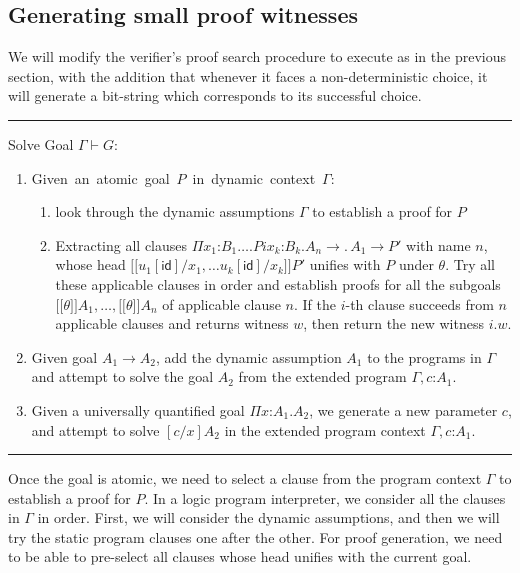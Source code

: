 \documentclass{acmconf}
\newcommand{\figfoot}{\vspace{1ex}\hrule}
\newcommand{\fighead}{\hrule\vspace{1.5ex}}
\newcommand{\ldot}{.\,}
\newcommand{\vd}{\vdash}
\newcommand{\arrow}{\rightarrow}
\newcommand{\oftp}{\mathord{:}}
\newcommand{\lbb}{{[\![}}
\newcommand{\rbb}{{]\!]}}
\newcommand{\id}{\mathsf{id}}
\newcommand{\msub}[1]{\lbb #1 \rbb}
\begin{document}
\subsection{Generating small proof witnesses}

We will modify the verifier's proof search procedure to execute as in
the previous section, with the addition that whenever it faces a
non-deterministic choice, it will generate a bit-string which
corresponds to its successful choice. 

\fighead
\begin{small}
Solve Goal $\Gamma \vd G$:
\begin{enumerate}
\item \mbox{Given an atomic goal $P$ in dynamic context
    $\Gamma$:}\hfill\\
  \begin{enumerate}
  \item look through the dynamic assumptions $\Gamma$ to establish a proof for $P$ 
  \item Extracting all clauses $\Pi x_1\oftp B_1\ldots.Pi x_k\oftp
    B_k. A_n \rightarrow \ldot A_1 \rightarrow P'$ with name $n$,
    whose head $\msub{u_1[\id]/x_1, \ldots u_k[\id]/x_k}P'$ unifies
    with $P$ under $\theta$. Try all these applicable clauses in
    order and establish proofs for all the subgoals
    $\msub{\theta}A_1, \ldots, \msub{\theta}A_n$ of applicable clause
    $n$. If the $i$-th clause succeeds from $n$ applicable clauses and
    returns witness $w$, then return the new witness $i . w$.
  \end{enumerate}

\item Given goal $A_1 \arrow A_2$, add the dynamic assumption $A_1$ to the
  programs in $\Gamma$ and attempt to solve the goal $A_2$ from the extended
  program $\Gamma, c\oftp A_1$.
\item Given a universally quantified goal $\Pi x\oftp A_1. A_2$, we
     generate a new parameter $c$, and attempt to solve $[c/x]A_2$ in the
    extended program context $\Gamma, c\oftp A_1$.
\end{enumerate}
\end{small}
\figfoot 

Once the goal is atomic, we need to select a clause from the
program context $\Gamma$ to establish a proof for $P$. In a logic
program interpreter, we consider all the clauses in $\Gamma$ in order. 
First, we will consider the dynamic assumptions, and then we will try
the static program clauses one after the other. For proof generation,
we need to be able to pre-select all clauses whose head unifies with
the current goal.
\end{document}
